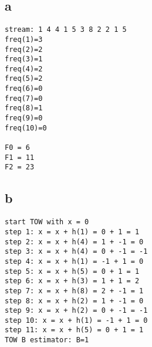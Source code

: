 \subsection*{a}
\begin{verbatim}
stream: 1 4 4 1 5 3 8 2 2 1 5 
freq(1)=3
freq(2)=2
freq(3)=1
freq(4)=2
freq(5)=2
freq(6)=0
freq(7)=0
freq(8)=1
freq(9)=0
freq(10)=0

F0 = 6
F1 = 11
F2 = 23
\end{verbatim}

\subsection*{b}
\begin{verbatim}
start TOW with x = 0
step 1: x = x + h(1) = 0 + 1 = 1
step 2: x = x + h(4) = 1 + -1 = 0
step 3: x = x + h(4) = 0 + -1 = -1
step 4: x = x + h(1) = -1 + 1 = 0
step 5: x = x + h(5) = 0 + 1 = 1
step 6: x = x + h(3) = 1 + 1 = 2
step 7: x = x + h(8) = 2 + -1 = 1
step 8: x = x + h(2) = 1 + -1 = 0
step 9: x = x + h(2) = 0 + -1 = -1
step 10: x = x + h(1) = -1 + 1 = 0
step 11: x = x + h(5) = 0 + 1 = 1
TOW B estimator: B=1
\end{verbatim}